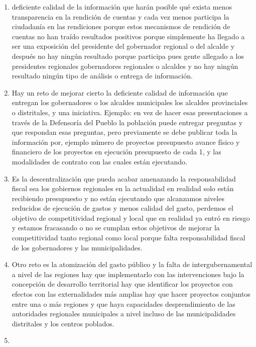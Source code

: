 \documentclass[
  a4paper,
]{article}
\begin{document}
\begin{enumerate}
\def\labelenumi{\arabic{enumi}.}
\setcounter{enumi}{3}
\item
  deficiente calidad de la información que harán posible qué exista
  menos transparencia en la rendición de cuentas y cada vez menos
  participa la ciudadanía en las rendiciones porque estos mecanismos de
  rendición de cuentas no han traído resultados positivos porque
  simplemente ha llegado a ser una exposición del presidente del
  gobernador regional o del alcalde y después no hay ningún resultado
  porque participa pues gente allegado a los presidentes regionales
  gobernadores regionales o alcaldes y no hay ningún resultado ningún
  tipo de análisis o entrega de información.
\item
  Hay un reto de mejorar cierto la deficiente calidad de información que
  entregan los gobernadores o los alcaldes municipales los alcaldes
  provinciales o distritales, y una iniciativa. Ejemplo: en vez de hacer
  esas presentaciones a través de la Defensoría del Pueblo la población
  puede entregar preguntas y que respondan esas preguntas, pero
  previamente se debe publicar toda la información por, ejemplo número
  de proyectos presupuesto avance físico y financiero de los proyectos
  en ejecución presupuesto de cada 1, y las modalidades de contrato con
  las cuales están ejecutando.
\item
  Es la descentralización que pueda acabar amenazando la responsabilidad
  fiscal sea los gobiernos regionales en la actualidad en realidad solo
  están recibiendo presupuesto y no están ejecutando que alcanzamos
  niveles reducidos de ejecución de gastos y menos calidad del gasto,
  perdemos el objetivo de competitividad regional y local que en
  realidad ya entró en riesgo y estamos fracasando o no se cumplan estos
  objetivos de mejorar la competitividad tanto regional como local
  porque falta responsabilidad fiscal de los gobernadores y las
  municipalidades.
\item
  Otro reto es la atomización del gasto público y la falta de
  intergubernamental a nivel de las regiones hay que implementarlo con
  las intervenciones bajo la concepción de desarrollo territorial hay
  que identificar los proyectos con efectos con las externalidades más
  amplias hay que hacer proyectos conjuntos entre una o más regiones y
  que haya capacidades desprendimiento de las autoridades regionales
  municipales a nivel incluso de las municipalidades distritales y los
  centros poblados.
\item

\end{enumerate}
\end{document}
